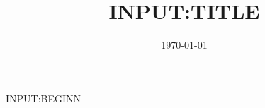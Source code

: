 \documentclass{article}
\title{{{INPUT:TITLE}}}
\date{\today} %
\begin{document}
\maketitle
\thispagestyle{fancy}


{{INPUT:BEGINN}}
\end{document}
